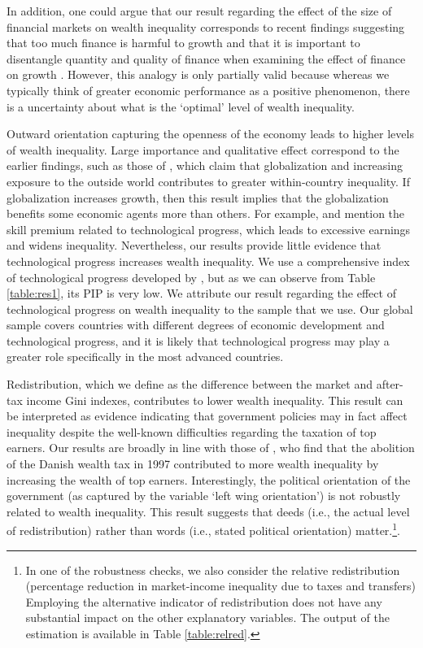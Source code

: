 \documentclass[a4paper,11pt]{article}
\begin{document}
In addition, one could argue that our result regarding the effect of the size of financial markets on wealth inequality corresponds to recent findings suggesting that too much finance is harmful to growth \citep{Arcandetal2012,CecchettiKharroubi2012,LawSingh2014} and that it is important to disentangle quantity and quality of finance when examining the effect of finance on growth \citep{hasan2016}. However, this analogy is only partially valid because whereas we typically think of greater economic performance as a positive phenomenon, there is a uncertainty about what is the `optimal' level of wealth inequality. 

Outward orientation capturing the openness of the economy leads to higher levels of wealth inequality. Large importance and qualitative effect correspond to the earlier findings, such as those of \citet{dabla2015causes}, which claim that globalization and increasing exposure to the outside world contributes to greater within-country inequality. If globalization increases growth, then this result implies that the globalization benefits some economic agents more than others. For example, \citet{dabla2015causes} and \citet{milanovic2016global} mention the skill premium related to technological progress, which leads to excessive earnings and widens inequality. Nevertheless, our results provide little evidence that technological progress increases wealth inequality. We use a comprehensive index of technological progress developed by \citet{comin}, but as we can observe from Table \ref{table:res1}, its PIP is very low. We attribute our result regarding the effect of technological progress on wealth inequality to the sample that we use. Our global sample covers countries with different degrees of economic development and technological progress, and it is likely that technological progress may play a greater role specifically in the most advanced countries. 

Redistribution, which we define as the difference between the market and after-tax income Gini indexes, contributes to lower wealth inequality. This result can be interpreted as evidence indicating that government policies may in fact affect inequality despite the well-known difficulties regarding the taxation of top earners. Our results are broadly in line with those of \citet{jakobsen2018}, who find that the abolition of the Danish wealth tax in 1997 contributed to more wealth inequality by increasing the wealth of top earners. Interestingly, the political orientation of the government (as captured by the variable `left wing orientation') is not robustly related to wealth inequality. This result suggests that deeds (i.e., the actual level of redistribution) rather than words (i.e., stated political orientation) matter.\footnote{In one of the robustness checks, we also consider the relative redistribution (percentage reduction in market-income inequality due to taxes and transfers) Employing the alternative indicator of redistribution does not have any substantial impact on the other explanatory variables. The output of the estimation is available in Table \ref{table:relred}.}.
\end{document}
